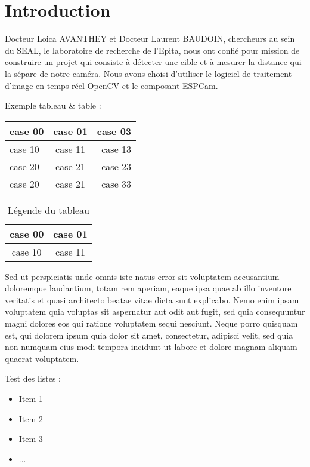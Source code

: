 	\chapter{Introduction}

Docteur Loica AVANTHEY et Docteur Laurent BAUDOIN, chercheurs au sein du SEAL, le laboratoire de recherche de l'Epita, nous ont confié pour mission de construire un projet qui consiste à détecter une cible et à mesurer la distance qui la sépare de notre caméra. Nous avons choisi d'utiliser le logiciel de traitement d'image en temps réel OpenCV et le composant ESPCam.
\newline

Exemple tableau \& table : 

\begin{tabular}{|l|c|r|}
	\hline \textbf{case 00} & \textbf{case 01} & \textbf{case 03} \\
	\hline case 10 & case 11 & case 13 \\ 
	case 20 & case 21 & case 23 \\ 
	case 20 & case 21 & case 33 \\ 
	\hline
\end{tabular}

\begin{table}
\begin{center}
	\begin{tabular}{|c|c|}
		\hline case 00 & case 01 \\
		\hline case 10 & case 11 \\ 
		\hline 
	\end{tabular}
	\caption{Légende du tableau}
\end{center}
\end{table}


Sed ut perspiciatis unde omnis iste natus error sit voluptatem accusantium doloremque laudantium, totam rem aperiam, eaque ipsa quae ab illo inventore veritatis et quasi architecto beatae vitae dicta sunt explicabo. Nemo enim ipsam voluptatem quia voluptas sit aspernatur aut odit aut fugit, sed quia consequuntur magni dolores eos qui ratione voluptatem sequi nesciunt. Neque porro quisquam est, qui dolorem ipsum quia dolor sit amet, consectetur, adipisci velit, sed quia non numquam eius modi tempora incidunt ut labore et dolore magnam aliquam quaerat voluptatem. 

Test des listes : 

\begin{itemize}
	\item Item 1
	\item Item 2
	\item Item 3
	\item ...
\end{itemize}


